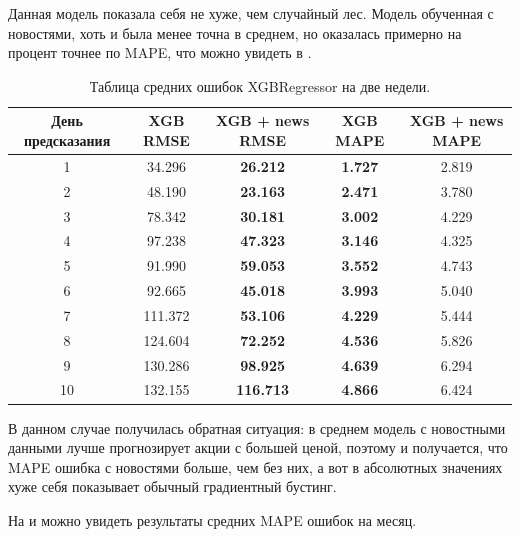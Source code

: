 \documentclass[12pt, a4paper]{article}
\begin{document}
Данная модель показала себя не хуже, чем случайный лес. Модель обученная с новостями, хоть и была менее точна в среднем, но оказалась примерно на процент точнее по MAPE, что можно увидеть в .
\begin{table}[H]
\centering
\caption{Таблица средних ошибок XGBRegressor на две недели.}
\begin{tabular}{ |c|c|c|c|c| } 
 \hline
 День предсказания & XGB RMSE & XGB + news RMSE & XGB MAPE & XGB + news MAPE \\ 
 \hline
1 & 34.296 & \textbf{26.212} & \textbf{1.727} & 2.819 \\ 
 \hline
2 & 48.190 & \textbf{23.163} & \textbf{2.471} & 3.780 \\ 
 \hline
3 & 78.342 & \textbf{30.181} & \textbf{3.002} & 4.229 \\ 
 \hline
4 & 97.238 & \textbf{47.323} & \textbf{3.146} & 4.325 \\ 
 \hline
5 & 91.990 & \textbf{59.053} & \textbf{3.552} & 4.743 \\ 
 \hline
6 & 92.665 & \textbf{45.018} & \textbf{3.993} & 5.040 \\ 
 \hline
7 & 111.372 &\textbf{ 53.106} & \textbf{4.229} & 5.444 \\ 
 \hline
8 & 124.604 & \textbf{72.252} & \textbf{4.536} & 5.826 \\ 
 \hline
9 & 130.286 & \textbf{98.925} & \textbf{4.639} & 6.294 \\ 
 \hline
10 & 132.155 & \textbf{116.713} & \textbf{4.866} & 6.424 \\ 
 \hline
\end{tabular}
\label{tab:xgboost}
\end{table}

В данном случае получилась обратная ситуация: в среднем модель с новостными данными лучше прогнозирует акции с большей ценой, поэтому и получается, что MAPE ошибка с новостями больше, чем без них, а вот в абсолютных значениях хуже себя показывает обычный градиентный бустинг.

На  и  можно увидеть результаты средних MAPE ошибок на месяц.
\end{document}
